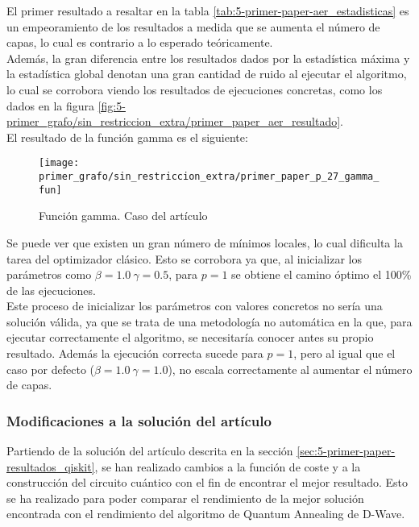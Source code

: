 \documentclass{article}
\begin{document}
El primer resultado a resaltar en la tabla \ref{tab:5-primer-paper-aer_estadisticas} es un empeoramiento de los resultados a medida que se aumenta el número de capas, lo cual es contrario a lo esperado teóricamente. \\
Además, la gran diferencia entre los resultados dados por la estadística máxima y la estadística global denotan una gran cantidad de ruido al ejecutar el algoritmo, lo cual se corrobora viendo los resultados de ejecuciones concretas, como los dados en la figura \ref{fig:5-primer_grafo/sin_restriccion_extra/primer_paper_aer_resultado}. \\

El resultado de la función gamma es el siguiente:
\begin{figure}[htbp]
  \centering
  \texttt{[image: primer\_grafo/sin\_restriccion\_extra/primer\_paper\_p\_27\_gamma\_fun]}
  \caption{Función gamma. Caso del artículo} \label{fig:5-primer_grafo/sin_restriccion_extra/primer_paper_p_27_gamma_fun}
\end{figure}

Se puede ver que existen un gran número de mínimos locales, lo cual dificulta la tarea del optimizador clásico. Esto se corrobora ya que, al inicializar los parámetros como \(\beta = 1.0 \ \gamma = 0.5\), para \(p = 1\) se obtiene el camino óptimo el 100\% de las ejecuciones. \\
Este proceso de inicializar los parámetros con valores concretos no sería una solución válida, ya que se trata de una metodología no automática en la que, para ejecutar correctamente el algoritmo, se necesitaría conocer antes su propio resultado. Además la ejecución correcta sucede para \(p = 1\), pero al igual que el caso por defecto (\(\beta = 1.0 \ \gamma = 1.0\)), no escala correctamente al aumentar el número de capas.

\subsubsection{Modificaciones a la solución del artículo}
Partiendo de la solución del artículo descrita en la sección \ref{sec:5-primer-paper-resultados_qiskit}, se han realizado cambios a la función de coste y a la construcción del circuito cuántico con el fin de encontrar el mejor resultado. Esto se ha realizado para poder comparar el rendimiento de la mejor solución encontrada con el rendimiento del algoritmo de Quantum Annealing de D-Wave.
\end{document}
